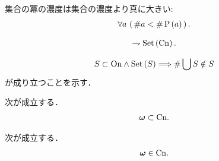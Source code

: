 	\begin{screen}
		\begin{thm}[Cantorの定理]
			集合の冪の濃度は集合の濃度より真に大きい:
			\begin{align}
				\forall a\, \left(\, \# a < \# \operatorname*{P} \left(a\right)\, \right).
			\end{align}
		\end{thm}
	\end{screen}
	
	\begin{screen}
		\begin{thm}[$\CN$は集合でない]
			\begin{align}
				\rightharpoondown \operatorname*{Set} \left(\mathrm{Cn}\right).
			\end{align}
		\end{thm}
	\end{screen}
	
	\begin{sketch}
		\begin{align}
			S \subset \mathrm{On} \wedge \operatorname*{Set} \left(S\right) \Longrightarrow \# \bigcup S \notin S
		\end{align}
		が成り立つことを示す．
	\end{sketch}
	
	\begin{screen}
		\begin{thm}[自然数は基数]
			次が成立する．
			\begin{align}
				{\boldsymbol \omega} \subset \mathrm{Cn}.
			\end{align}
		\end{thm}
	\end{screen}
	
	\begin{screen}
		\begin{thm}[$\omg$は基数]
			次が成立する．
			\begin{align}
				{\boldsymbol \omega} \in \mathrm{Cn}.
			\end{align}
		\end{thm}
	\end{screen}
	
